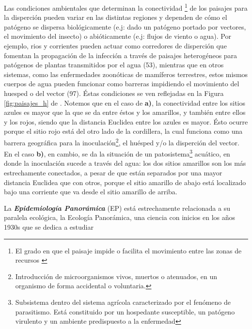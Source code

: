 \par Las condiciones ambientales que determinan la
  conectividad \footnote{El grado en que el paisaje impide o facilita el movimiento
  entre las zonas de recursos \cite{landscape_connectivity}} de los paisajes
  para la disperción pueden variar en las distintas regiones y dependen de cómo
  el patógeno se dispersa biológicamente (e.j: dado un patógeno portado por
  vectores, el movimiento del insecto) o abióticamente (e.j: flujos de viento o agua).
  Por ejemplo, rios y corrientes pueden actuar como corredores de disperción que
  fomentan la propagación de la infección a través de paisajes heterogéneos
  para patógenos de plantas transmitidos por el agua (53), mientras que en otros
  sistemas, como las enfermedades zoonóticas de mamíferos terrestres, estos mismos
  cuerpos de agua pueden funcionar como barreras impidiendo el movimiento
  del huesped o del vector (97). Éstas condiciones se ven reflejadas en la
  Figura \ref{fig:paisajes_h} de \cite{Landscape Epidemiology of Emerging Infectious...}.
  Notemos que en el caso de \textbf{a)}, la
  conectividad entre los sitios azules es mayor que la que se da entre éstos y
  los amarillos, y también entre ellos y los rojos, siendo que la distancia
  Euclidea entre los azules es mayor. Ésto ocurre porque el sitio rojo está del otro lado
  de la cordillera, la cual funciona como una barrera geográfica para la
  inoculación\footnote{Introducción de microorganismos vivos, muertos o atenuados,
  en un organismo de forma accidental o voluntaria.}, el huésped y/o la disperción
  del vector. En el caso \textbf{b)}, en cambio, se da la situación de un
  patosistema\footnote{Subsistema dentro del sistema agrícola caracterizado por el
  fenómeno de parasitismo. Está constituido por un hospedante susceptible,
  un patógeno virulento y un ambiente predispuesto a la enfermedad} acuático, en
  donde la inoculación sucede a través del agua: los dos sitios amarillos son los
  más estrechamente conectados, a pesar de que están separados por una mayor
  distancia Euclidea que con otros, porque el sitio amarillo de abajo está localizado
  bajo una corriente que va desde el sitio amarillo de arriba.
  \par La \textbf{\textit{Epidemiología Panorámica}}\cite{nidality, ostfeld_re_emerging}
  (EP) está estrechamente relacionada a su paralela ecológica, la Ecología
  Panorámica, una ciencia con inicios en los años 1930s que se dedica a estudiar
